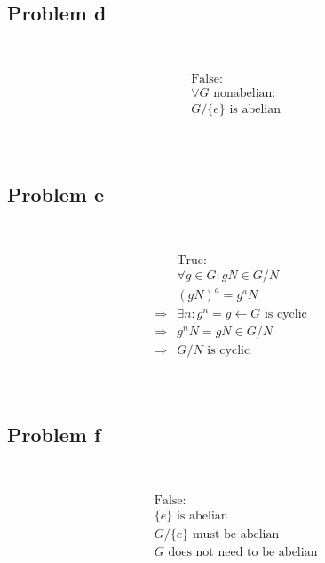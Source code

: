 \documentclass{article}
\begin{document}
~

\subsection*{Problem d}

~

\begin{equation*}
    \begin{split}
        &\text{False}:\\
        &\forall G\text{ nonabelian}:\\
        &G/\{e\}\text{ is abelian}\\
    \end{split}
\end{equation*}

~

\subsection*{Problem e}

~

\begin{equation*}
    \begin{split}
        &\text{True}:\\
        &\forall g\in G:gN\in G/N\\
        &(gN)^a=g^aN\\
        \Rightarrow&\exists n:g^n=g\leftarrow G\text{ is cyclic}\\
        \Rightarrow&g^nN=gN\in G/N\\
        \Rightarrow&G/N\text{ is cyclic}\\
    \end{split}
\end{equation*}

~

\subsection*{Problem f}

~

\begin{equation*}
    \begin{split}
        &\text{False}:\\
        &\{e\}\text{ is abelian}\\
        &G/\{e\}\text{ must be abelian}\\
        &G\text{ does not need to be abelian}\\
    \end{split}
\end{equation*}
\end{document}
